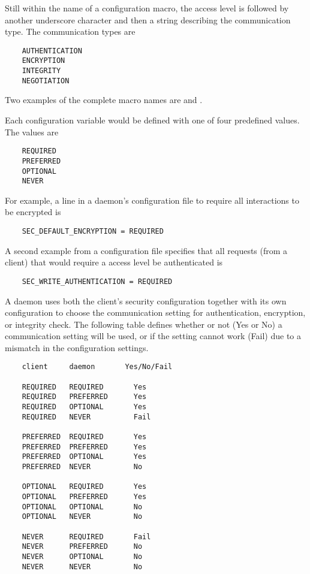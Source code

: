 Still within the name of a configuration macro,
the access level is followed by another underscore
character and then a string describing the communication type.
The communication types are
\begin{verbatim}
    AUTHENTICATION
    ENCRYPTION
    INTEGRITY
    NEGOTIATION
\end{verbatim}
Two examples of the complete macro names are
and
.

Each configuration variable would be defined with one
of four predefined values.
The values are
\begin{verbatim}
    REQUIRED
    PREFERRED
    OPTIONAL
    NEVER 
\end{verbatim}
For example, a line in a daemon's configuration file
to require all interactions to be encrypted is
\begin{verbatim}
    SEC_DEFAULT_ENCRYPTION = REQUIRED
\end{verbatim}
A second example from a configuration file specifies that all
requests (from a client) that would require a 
access level be authenticated is
\begin{verbatim}
    SEC_WRITE_AUTHENTICATION = REQUIRED
\end{verbatim}

A daemon uses both the client's security configuration
together with its own configuration to choose the communication
setting
for authentication, encryption, or integrity check.
The following table defines whether or not (Yes or No) a
communication setting will be used, or if the setting cannot
work (Fail) due to a mismatch in the configuration settings.

\begin{verbatim}
    client     daemon       Yes/No/Fail

    REQUIRED   REQUIRED       Yes
    REQUIRED   PREFERRED      Yes
    REQUIRED   OPTIONAL       Yes
    REQUIRED   NEVER          Fail

    PREFERRED  REQUIRED       Yes
    PREFERRED  PREFERRED      Yes
    PREFERRED  OPTIONAL       Yes
    PREFERRED  NEVER          No

    OPTIONAL   REQUIRED       Yes
    OPTIONAL   PREFERRED      Yes
    OPTIONAL   OPTIONAL       No
    OPTIONAL   NEVER          No

    NEVER      REQUIRED       Fail
    NEVER      PREFERRED      No
    NEVER      OPTIONAL       No
    NEVER      NEVER          No
\end{verbatim}

